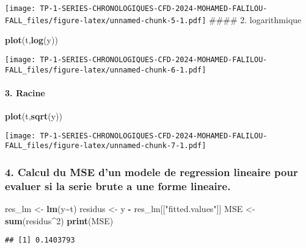 \documentclass[
]{article}
\newenvironment{Shaded}{\begin{snugshade}}{\end{snugshade}}
\newcommand{\DecValTok}[1]{\textcolor[rgb]{0.00,0.00,0.81}{#1}}
\newcommand{\FunctionTok}[1]{\textcolor[rgb]{0.13,0.29,0.53}{\textbf{#1}}}
\newcommand{\NormalTok}[1]{#1}
\newcommand{\OtherTok}[1]{\textcolor[rgb]{0.56,0.35,0.01}{#1}}
\newcommand{\SpecialCharTok}[1]{\textcolor[rgb]{0.81,0.36,0.00}{\textbf{#1}}}
\newcommand{\StringTok}[1]{\textcolor[rgb]{0.31,0.60,0.02}{#1}}
\begin{document}
\texttt{[image: TP-1-SERIES-CHRONOLOGIQUES-CFD-2024-MOHAMED-FALILOU-FALL\_files/figure-latex/unnamed-chunk-5-1.pdf]}
\#\#\#\# 2. logarithmique

\begin{Shaded}
\begin{Highlighting}[]
\FunctionTok{plot}\NormalTok{(t,}\FunctionTok{log}\NormalTok{(y))}
\end{Highlighting}
\end{Shaded}

\texttt{[image: TP-1-SERIES-CHRONOLOGIQUES-CFD-2024-MOHAMED-FALILOU-FALL\_files/figure-latex/unnamed-chunk-6-1.pdf]}

\paragraph{3. Racine}\label{racine}

\begin{Shaded}
\begin{Highlighting}[]
\FunctionTok{plot}\NormalTok{(t,}\FunctionTok{sqrt}\NormalTok{(y))}
\end{Highlighting}
\end{Shaded}

\texttt{[image: TP-1-SERIES-CHRONOLOGIQUES-CFD-2024-MOHAMED-FALILOU-FALL\_files/figure-latex/unnamed-chunk-7-1.pdf]}

\subsubsection{4. Calcul du MSE d'un modele de regression lineaire pour
evaluer si la serie brute a une forme
lineaire.}\label{calcul-du-mse-dun-modele-de-regression-lineaire-pour-evaluer-si-la-serie-brute-a-une-forme-lineaire.}

\begin{Shaded}
\begin{Highlighting}[]
\NormalTok{res\_lm  }\OtherTok{\textless{}{-}} \FunctionTok{lm}\NormalTok{(y}\SpecialCharTok{\textasciitilde{}}\NormalTok{t)}
\NormalTok{residus }\OtherTok{\textless{}{-}}\NormalTok{ y }\SpecialCharTok{{-}}\NormalTok{ res\_lm[[}\StringTok{"fitted.values"}\NormalTok{]]}
\NormalTok{MSE }\OtherTok{\textless{}{-}} \FunctionTok{sum}\NormalTok{(residus}\SpecialCharTok{\^{}}\DecValTok{2}\NormalTok{)}
\FunctionTok{print}\NormalTok{(MSE)}
\end{Highlighting}
\end{Shaded}

\begin{verbatim}
## [1] 0.1403793
\end{verbatim}
\end{document}

